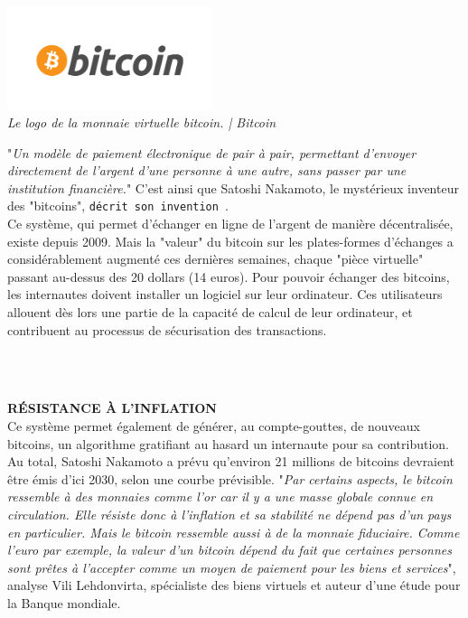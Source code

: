 \documentclass[11pt,twoside,a4paper]{article}
\begin{document}
\begin{minipage}[ht]{6.25cm}	
	\includegraphics[width=6.00cm]{img/1537310_3_ab4d_le-logo-de-la-monnaie-virtuelle-bitcoin.png} ~\\
	\emph{Le logo de la monnaie virtuelle bitcoin. | Bitcoin}
\end{minipage} \hfill \begin{minipage}[ht]{12.50cm}
	"\emph{Un mod{\`e}le de paiement {\'e}lectronique de pair {\`a} pair, permettant d'envoyer directement de l'argent d'une personne {\`a} une autre, sans passer par une institution financi{\`e}re.}" C'est ainsi que Satoshi Nakamoto, le myst{\'e}rieux inventeur des "bitcoins", \texttt{d{\'e}crit son invention~\footnotemark}. ~\\
	
	Ce syst{\`e}me, qui permet d'{\'e}changer en ligne de l'argent de mani{\`e}re d{\'e}centralis{\'e}e, existe depuis 2009. Mais la "valeur" du bitcoin sur les plates-formes d'{\'e}changes a consid{\'e}rablement augment{\'e} ces derni{\`e}res semaines, chaque "pi{\`e}ce virtuelle" passant au-dessus des 20 dollars (14 euros). Pour pouvoir {\'e}changer des bitcoins, les internautes doivent installer un logiciel sur leur ordinateur. Ces utilisateurs allouent d{\`e}s lors une partie de la capacit{\'e} de calcul de leur ordinateur, et contribuent au processus de s{\'e}curisation des transactions. ~\\
\end{minipage}~\\
~

\textbf{\textsc{R{\'E}SISTANCE {\`A} L'INFLATION}}~\\

Ce syst{\`e}me permet {\'e}galement de g{\'e}n{\'e}rer, au compte-gouttes, de nouveaux bitcoins, un algorithme gratifiant au hasard un internaute pour sa contribution. Au total, Satoshi Nakamoto a pr{\'e}vu qu'environ 21 millions de bitcoins devraient {\^e}tre {\'e}mis d'ici 2030, selon une courbe pr{\'e}visible. "\emph{Par certains aspects, le bitcoin ressemble {\`a} des monnaies comme l'or car il y a une masse globale connue en circulation. Elle r{\'e}siste donc {\`a} l'inflation et sa stabilit{\'e} ne d{\'e}pend pas d'un pays en particulier. Mais le bitcoin ressemble aussi {\`a} de la monnaie fiduciaire. Comme l'euro par exemple, la valeur d'un bitcoin d{\'e}pend du fait que certaines personnes sont pr{\^e}tes {\`a} l'accepter comme un moyen de paiement pour les biens et services}", analyse Vili Lehdonvirta, sp{\'e}cialiste des biens virtuels et auteur d'une {\'e}tude pour la Banque mondiale. ~\\
\end{document}
